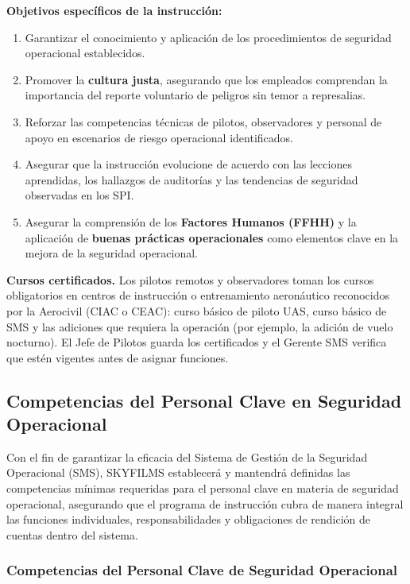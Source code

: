 \textbf{Objetivos específicos de la instrucción:}

\begin{enumerate}
    \item Garantizar el conocimiento y aplicación de los procedimientos de seguridad operacional establecidos.
    \item Promover la \textbf{cultura justa}, asegurando que los empleados comprendan la importancia del reporte voluntario de peligros sin temor a represalias.
    \item Reforzar las competencias técnicas de pilotos, observadores y personal de apoyo en escenarios de riesgo operacional identificados.
    \item Asegurar que la instrucción evolucione de acuerdo con las lecciones aprendidas, los hallazgos de auditorías y las tendencias de seguridad observadas en los SPI.
    \item Asegurar la comprensión de los \textbf{Factores Humanos (FFHH)} y la aplicación de \textbf{buenas prácticas operacionales} como elementos clave en la mejora de la seguridad operacional.
\end{enumerate}


\textbf{Cursos certificados.} Los pilotos remotos y observadores toman los cursos obligatorios en centros de instrucción o entrenamiento aeronáutico reconocidos por la Aerocivil (CIAC o CEAC): curso básico de piloto UAS, curso básico de SMS y las adiciones que requiera la operación (por ejemplo, la adición de vuelo nocturno). El Jefe de Pilotos guarda los certificados y el Gerente SMS verifica que estén vigentes antes de asignar funciones.

\subsection{Competencias del Personal Clave en Seguridad Operacional}

Con el fin de garantizar la eficacia del Sistema de Gestión de la Seguridad Operacional (SMS), SKYFILMS establecerá y mantendrá definidas las competencias mínimas requeridas para el personal clave en materia de seguridad operacional, asegurando que el programa de instrucción cubra de manera integral las funciones individuales, responsabilidades y obligaciones de rendición de cuentas dentro del sistema.\\

\subsubsection{Competencias del Personal Clave de Seguridad Operacional}

